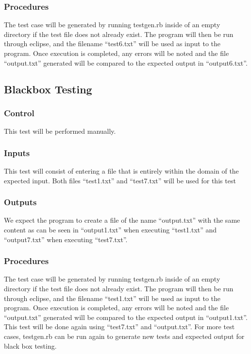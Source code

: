 \documentclass[]{article}
\begin{document}
	\subsubsection{Procedures}
	The test case will be generated by running testgen.rb inside of an empty
	directory if the test file does not already exist.  The program will then be
	run through eclipse, and the filename ``test6.txt'' will be used as input to
	the program.  Once execution is completed, any errors will be noted and the
	file ``output.txt'' generated will be compared to the expected output in
	``output6.txt''.
	

\subsection{Blackbox Testing}
	\subsubsection{Control}
	This test will be performed manually.
	
	\subsubsection{Inputs}
	This test will consist of entering a file that is entirely within the domain of
	the expected input.  Both files ``test1.txt'' and ``test7.txt'' will be used
	for this test
	
	\subsubsection{Outputs}
	We expect the program to create a file of the name ``output.txt'' with the same
	content as can be seen in ``output1.txt'' when executing ``test1.txt'' and
	``output7.txt'' when executing ``test7.txt''.
	
	\subsubsection{Procedures}
	The test case will be generated by running testgen.rb inside of an empty
	directory if the test file does not already exist.  The program will then be
	run through eclipse, and the filename ``test1.txt'' will be used as input to
	the program.  Once execution is completed, any errors will be noted and the
	file ``output.txt'' generated will be compared to the expected output in
	``output1.txt''.  This test will be done again using ``test7.txt'' and
	``output.txt''.  For more test cases, testgen.rb can be run again to generate
	new tests and expected output for black box testing.
	
\end{document}
